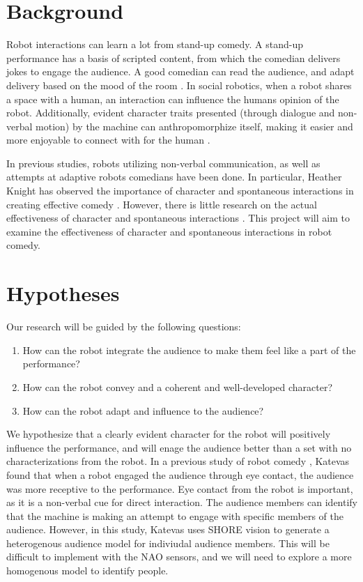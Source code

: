 \documentclass[onecolumn, draftclsnofoot,10pt, compsoc]{IEEEtran}
\begin{document}
\section{Background}
Robot interactions can learn a lot from stand-up comedy. A stand-up performance has a basis of scripted content, from which the comedian delivers jokes to engage the audience. A good comedian can read the audience, and adapt delivery based on the mood of the room \cite{talkingFunny}. In social robotics, when a robot shares a space with a human, an interaction can influence the humans opinion of the robot. Additionally, evident character traits presented (through dialogue and non-verbal motion) by the machine can anthropomorphize itself, making it easier and more enjoyable to connect with for the human \cite{KnightEightLessons:2011}.

In previous studies, robots utilizing non-verbal communication, as well as attempts at adaptive robots comedians have been done. In particular, Heather Knight has observed the importance of character and spontaneous interactions in creating effective comedy \cite{KnightEightLessons:2011}. However, there is little research on the actual effectiveness of character and spontaneous interactions \cite{KatevasRobot:2014}. This project will aim to examine the effectiveness of character and spontaneous interactions in robot comedy.


\section{Hypotheses}

Our research will be guided by the following questions:
\begin{enumerate}[\IEEEsetlabelwidth{6)}]
\item How can the robot integrate the audience to make them feel like a part of the performance?
\item How can the robot convey and a coherent and well-developed character?
\item How can the robot adapt and influence to the audience?
\end{enumerate}

We hypothesize that a clearly evident character for the robot will positively influence the performance, and will enage the audience better than a set with no characterizations from the robot. In a previous study of robot comedy \cite{RobotComedyLab:2015}, Katevas found that when a robot engaged the audience through eye contact, the audience was more receptive to the performance. Eye contact from the robot is important, as it is a non-verbal cue for direct interaction. The audience members can identify that the machine is making an attempt to engage with specific members of the audience. However, in this study, Katevas uses SHORE vision \cite{SHORE} to generate a heterogenous audience model for indiviudal audience members. This will be difficult to implement with the NAO sensors, and we will need to explore a more homogenous model to identify people.
\end{document}
